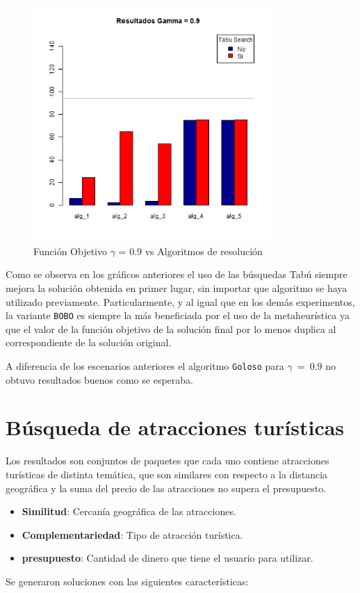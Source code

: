 \begin{figure}[H]
  \centering
    \includegraphics[width=0.8\textwidth]{resultados/affiliations/Graficos_agrupados/gamma09-affiliations.png}
  \caption{Función Objetivo $\gamma$ = $0.9$ vs Algoritmos de resolución}
  \label{res:img-affiliations-agr-gamma09}
\end{figure}

Como se observa en los gráficos anteriores el uso de las búsquedas Tabú siempre mejora la solución obtenida en primer lugar, sin importar que algoritmo se haya utilizado previamente. Particularmente, y al igual que en los demás experimentos, la variante \texttt{BOBO} es siempre la más beneficiada por el uso de la metaheurística ya que el valor de la función objetivo de la solución final por lo menos duplica al correspondiente de la solución original.

A diferencia de los escenarios anteriores el algoritmo \texttt{Goloso} para $\gamma\ =\ 0.9$ no obtuvo resultados buenos como se esperaba.
\newpage
\section{Búsqueda de atracciones turísticas}\label{res:busAtracciones}
Los resultados son conjuntos de paquetes que cada uno contiene atracciones turísticas de distinta temática, que son similares con respecto a la distancia geográfica y la suma del precio de las atracciones no supera el presupuesto.
\begin{itemize}
  \item \textbf{Similitud}: Cercanía geográfica de las atracciones.
  \item \textbf{Complementariedad}: Tipo de atracción turística.
  \item \textbf{presupuesto}: Cantidad de dinero que tiene el usuario para utilizar.
\end{itemize}
Se generaron soluciones con las siguientes características:\\

